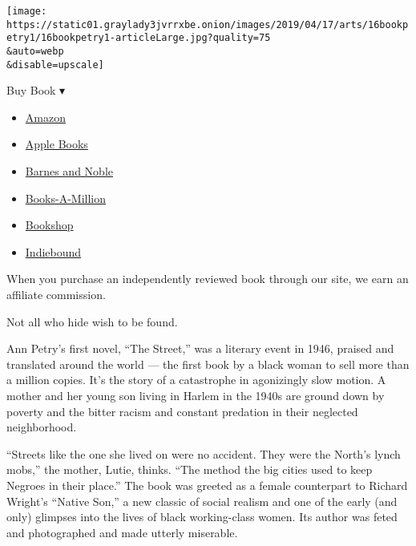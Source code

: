 \texttt{[image: https://static01.graylady3jvrrxbe.onion/images/2019/04/17/arts/16bookpetry1/16bookpetry1-articleLarge.jpg?quality=75\\\&auto=webp\\\&disable=upscale]}

Buy Book ▾

\begin{itemize}
\tightlist
\item
  \href{https://www.amazon.com/gp/search?index=books\&tag=NYTBSREV-20\&field-keywords=The+Street+and+The+Narrows+Ann+Petry}{Amazon}
\item
  \href{https://du-gae-books-dot-nyt-du-prd.appspot.com/buy?title=The+Street+and+The+Narrows\&author=Ann+Petry}{Apple
  Books}
\item
  \href{https://www.anrdoezrs.net/click-7990613-11819508?url=https\%3A\%2F\%2Fwww.barnesandnoble.com\%2Fw\%2F\%3Fean\%3D9781598536010}{Barnes
  and Noble}
\item
  \href{https://www.anrdoezrs.net/click-7990613-35140?url=https\%3A\%2F\%2Fwww.booksamillion.com\%2Fp\%2FThe\%2BStreet\%2Band\%2BThe\%2BNarrows\%2FAnn\%2BPetry\%2F9781598536010}{Books-A-Million}
\item
  \href{https://bookshop.org/a/3546/9781598536010}{Bookshop}
\item
  \href{https://www.indiebound.org/book/9781598536010?aff=NYT}{Indiebound}
\end{itemize}

When you purchase an independently reviewed book through our site, we
earn an affiliate commission.

Not all who hide wish to be found.

Ann Petry's first novel, ``The Street,'' was a literary event in 1946,
praised and translated around the world --- the first book by a black
woman to sell more than a million copies. It's the story of a
catastrophe in agonizingly slow motion. A mother and her young son
living in Harlem in the 1940s are ground down by poverty and the bitter
racism and constant predation in their neglected neighborhood.

``Streets like the one she lived on were no accident. They were the
North's lynch mobs,'' the mother, Lutie, thinks. ``The method the big
cities used to keep Negroes in their place.'' The book was greeted as a
female counterpart to Richard Wright's ``Native Son,'' a new classic of
social realism and one of the early (and only) glimpses into the lives
of black working-class women. Its author was feted and photographed and
made utterly miserable.

